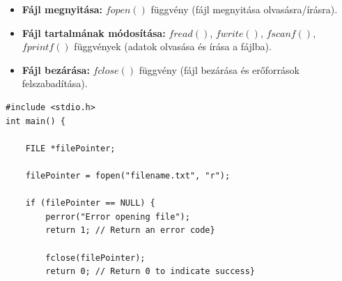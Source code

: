 \documentclass[11pt,a4paper]{article}
\begin{document}
            \begin{tcolorbox}[colback=blue!5!white,colframe=blue!50!black,title= 62. Ismertesse a szöveges fájlok módosításának lépéseit!]
                \begin{itemize}
                    \item \textbf{Fájl megnyitása:} \(fopen()\) függvény (fájl megnyitása olvasásra/írásra).
                    \item \textbf{Fájl tartalmának módosítása:} \(fread()\), \(fwrite()\), \(fscanf()\), \(fprintf()\) függvények (adatok olvasása és írása a fájlba).
                    \item \textbf{Fájl bezárása:} \(fclose()\) függvény (fájl bezárása és erőforrások felszabadítása).
                \end{itemize}
                \begin{Verbatim}
#include <stdio.h>
int main() {
    
    FILE *filePointer;             

    filePointer = fopen("filename.txt", "r");               

    if (filePointer == NULL) {
        perror("Error opening file");
        return 1; // Return an error code}

        fclose(filePointer);
        return 0; // Return 0 to indicate success}                    
                \end{Verbatim}
            \end{tcolorbox}
\end{document}
